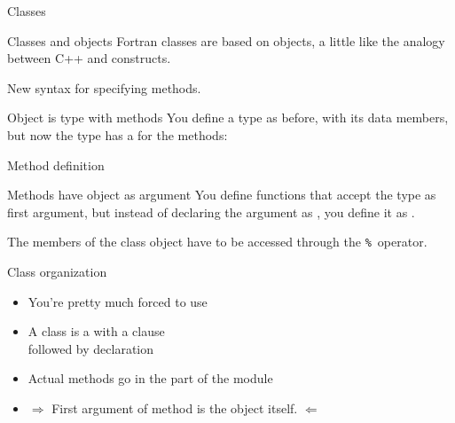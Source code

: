 
 {Classes}
\label{sec:objectf}

\begin{block}{Classes and objects}
  \label{sl:fclass}
Fortran classes are based on  objects, a little like the
analogy between C++  and  constructs.

New syntax for specifying methods.
\end{block}

\begin{block}{Object is type with methods}
  \label{sl:fclass-prog}
  You define a type as before, with its data members, but now the type
  has a  for the
  methods:
  \footnotesize
  \begin{multicols}{2}
  \end{multicols}
\end{block}

\begin{block}{Method definition}
  \label{sl:fclass-method}
\end{block}

\begin{block}{Methods have object as argument}
  \label{sl:fclass-self}
  You define functions that accept the type as first argument, but
  instead of declaring the argument as , you define it as
  .

  The members of the class object have to be accessed through the
  \verb+%+~operator.
\end{block}

\begin{block}{Class organization}
  \label{sl:fclass-org}
  \begin{itemize}
  \item You're pretty much forced to use 
  \item A class is a  with a  clause\\
    followed by  declaration
  \item Actual methods go in the  part of the module
  \item $\Rightarrow$ First argument of method is the object itself. $\Leftarrow$
  \end{itemize}
\end{block}

